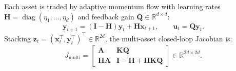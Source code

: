 \documentclass[12pt]{article}
\theoremstyle{definition}
\theoremstyle{remark}
\newcommand{\R}{\mathbb{R}}
\newcommand{\diag}{\operatorname{diag}}
\begin{document}
Each asset is traded by adaptive momentum flow with learning rates $\mathbf{H} = \diag(\eta_1, \dots, \eta_d)$ and feedback gain $\mathbf{Q} \in \R^{d \times d}$:
\begin{equation}
\mathbf{y}_{t+1} = (\mathbf{I} - \mathbf{H}) \mathbf{y}_t + \mathbf{H} \mathbf{x}_{t+1}, \qquad \mathbf{u}_t = \mathbf{Q} \mathbf{y}_t.
\end{equation}
Stacking $\mathbf{z}_t = (\mathbf{x}_t^\top, \mathbf{y}_t^\top)^\top \in \R^{2d}$, the multi-asset closed-loop Jacobian is:
\begin{equation}
J_{\text{multi}} = \begin{bmatrix}
\mathbf{A} & \mathbf{K} \mathbf{Q} \\
\mathbf{H} \mathbf{A} & \mathbf{I} - \mathbf{H} + \mathbf{H} \mathbf{K} \mathbf{Q}
\end{bmatrix} \in \R^{2d \times 2d}.
\label{eq:multi_jacobian}
\end{equation}
\end{document}
